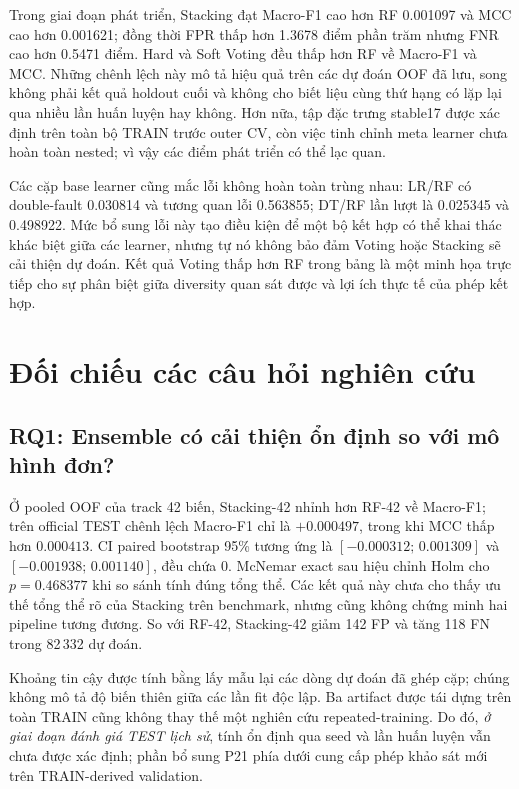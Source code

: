 Trong giai đoạn phát triển, Stacking đạt Macro-F1 cao hơn RF 0.001097 và MCC cao hơn 0.001621; đồng thời FPR thấp hơn 1.3678 điểm phần trăm nhưng FNR cao hơn 0.5471 điểm. Hard và Soft Voting đều thấp hơn RF về Macro-F1 và MCC. Những chênh lệch này mô tả hiệu quả trên các dự đoán OOF đã lưu, song không phải kết quả holdout cuối và không cho biết liệu cùng thứ hạng có lặp lại qua nhiều lần huấn luyện hay không. Hơn nữa, tập đặc trưng stable17 được xác định trên toàn bộ TRAIN trước outer CV, còn việc tinh chỉnh meta learner chưa hoàn toàn nested; vì vậy các điểm phát triển có thể lạc quan.

Các cặp base learner cũng mắc lỗi không hoàn toàn trùng nhau: LR/RF có double-fault 0.030814 và tương quan lỗi 0.563855; DT/RF lần lượt là 0.025345 và 0.498922. Mức bổ sung lỗi này tạo điều kiện để một bộ kết hợp có thể khai thác khác biệt giữa các learner, nhưng tự nó không bảo đảm Voting hoặc Stacking sẽ cải thiện dự đoán. Kết quả Voting thấp hơn RF trong bảng là một minh họa trực tiếp cho sự phân biệt giữa diversity quan sát được và lợi ích thực tế của phép kết hợp.

\section{Đối chiếu các câu hỏi nghiên cứu}
\label{sec:revision-rq-all}

\subsection{RQ1: Ensemble có cải thiện ổn định so với mô hình đơn?}
\label{sec:revision-rq1}
Ở pooled OOF của track 42 biến, Stacking-42 nhỉnh hơn RF-42 về Macro-F1; trên official TEST chênh lệch Macro-F1 chỉ là $+0.000497$, trong khi MCC thấp hơn $0.000413$. CI paired bootstrap 95\% tương ứng là $[-0.000312;\,0.001309]$ và $[-0.001938;\,0.001140]$, đều chứa 0. McNemar exact sau hiệu chỉnh Holm cho $p=0.468377$ khi so sánh tính đúng tổng thể. Các kết quả này chưa cho thấy ưu thế tổng thể rõ của Stacking trên benchmark, nhưng cũng không chứng minh hai pipeline tương đương. So với RF-42, Stacking-42 giảm 142 FP và tăng 118 FN trong 82\,332 dự đoán.

Khoảng tin cậy được tính bằng lấy mẫu lại các dòng dự đoán đã ghép cặp; chúng không mô tả độ biến thiên giữa các lần fit độc lập. Ba artifact được tái dựng trên toàn TRAIN cũng không thay thế một nghiên cứu repeated-training. Do đó, \emph{ở giai đoạn đánh giá TEST lịch sử}, tính ổn định qua seed và lần huấn luyện vẫn chưa được xác định; phần bổ sung P21 phía dưới cung cấp phép khảo sát mới trên TRAIN-derived validation.

